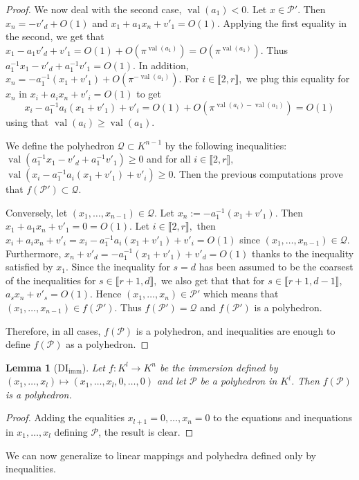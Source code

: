 \documentclass[sigconf]{acmart}
\newcommand{\PP}{\mathcal{P}}
\newcommand{\Qc}{\mathcal{Q}}
\newtheorem{lemma}[theorem]{Lemma}
\DeclareMathOperator{\val}{val}
\begin{document}
\begin{proof}
We now deal with the second case, $\val(a_1)<0.$
Let $x \in \PP'$.
Then $x_n=-v'_d+O(1)$
and $x_1+a_1 x_n+v'_1=O(1).$
Applying the first equality in the second, we get that
$x_1-a_1 v'_d +v'_1=O(1)+O(\pi^{\val(a_1)})=O(\pi^{\val(a_1)}).$
Thus $a_1^{-1}x_1- v'_d +a_1^{-1}v'_1=O(1)$.
In addition, $x_n=-a_1^{-1}(x_1+v'_1)+O(\pi^{-\val(a_1)}).$
For $i \in \llbracket 2,r \rrbracket,$ we plug this equality for $x_n$ in 
$x_i+a_i x_n+v'_i=O(1)$ to get
$$
x_i-a_1^{-1}a_i(x_1+v'_1)+v'_i=O(1)+O(\pi^{\val(a_i)-\val(a_1)})=O(1)
$$
using that $\val(a_i) \geq \val (a_1).$

We define the polyhedron $\Qc \subset K^{n-1}$ by the following inequalities:
$\val(a_1^{-1}x_1- v'_d +a_1^{-1}v'_1) \geq 0$ and for all $i \in \llbracket 2,r \rrbracket,$
$\val(x_i-a_1^{-1}a_i(x_1+v'_1)+v'_i) \geq 0.$
Then the previous computations prove that $f(\PP')\subset \Qc.$

Conversely, let $(x_1,\dots,x_{n-1}) \in \Qc.$
Let $x_n := -a_1^{-1}(x_1+v'_1).$
Then
$x_1+a_1 x_n+v'_1=0=O(1).$
Let $i \in \llbracket 2,r \rrbracket,$
then $x_i+a_i x_n+v'_i=x_i-a_1^{-1}a_i(x_1+v'_1)+v'_i=O(1)$
since $(x_1,\dots,x_{n-1}) \in \Qc.$
Furthermore, 
$x_n+v'_d=-a_1^{-1}(x_1+v'_1)+v'_d=O(1)$ thanks to the inequality satisfied by $x_1.$
Since the inequality for $s=d$ has been assumed to be 
the coarsest of the inequalities for $s \in \llbracket r+1,d \rrbracket,$
we also get that that for $s \in \llbracket r+1,d-1 \rrbracket,$
$a_s x_n+v'_s = O(1)$.
Hence $(x_1,\dots,x_n) \in \PP'$
which means that $(x_1,\dots,x_{n-1}) \in f(\PP').$
Thus $f(\PP')= \Qc$ and $f(\PP')$ is a polyhedron.

Therefore, in all cases, $f(\PP)$ is a polyhedron, and inequalities are enough to define
$f(\PP)$ as a polyhedron.
\end{proof}

\begin{lemma}[DI${}_{\mathrm{imm}}$]
  Let $f : K^l \to K^n$ be the immersion defined by
  $(x_1,\dots, x_l) \mapsto (x_1,\dots, x_l,0,\dots, 0)$ and let $\PP$ be
  a polyhedron in $K^l$. Then $f(\PP)$ is a polyhedron. \label{lem:DIimm}
\end{lemma}
\begin{proof}
Adding the equalities $x_{l+1}=0, \dots, x_n=0$ to the equations and inequations in
$x_1,\dots, x_l$ defining $\PP$, the result is clear.
\end{proof}

We can now generalize to linear mappings and polyhedra defined only by inequalities.
\end{document}
